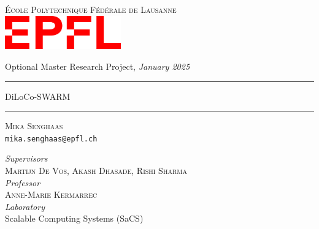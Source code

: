 \documentclass{article}
\begin{document}
\begin{titlepage}
\begin{center}
    \Large{\textsc{École Polytechnique Fédérale de Lausanne}}\\
    \vspace{1cm}
    \includegraphics[width=5cm]{figures/epfl.png}
    \vspace{1cm}
    
    \large{Optional Master Research Project, \textit{January 2025}}\\
    
    \vspace{1cm}
    \rule{\textwidth}{1pt}\vspace{15pt}
    \Huge{DiLoCo-SWARM}
    \rule{\textwidth}{1pt}
    
    \vspace{1cm}
    
    \large{\textsc{Mika Senghaas}\\\texttt{mika.senghaas@epfl.ch}}
    
    \large{
      \textit{Supervisors}\\
      \textsc{Martijn De Vos}, \textsc{Akash Dhasade}, \textsc{Rishi Sharma}}\\
      \vspace{0.5cm}
      \textit{Professor}\\
      \textsc{Anne-Marie Kermarrec}\\
      \vspace{0.5cm}
      \large{\textit{Laboratory}\\
      Scalable Computing Systems (SaCS)\\
    }
\end{center}
\end{titlepage}

\printAffiliationsAndNotice{}
\end{document}
